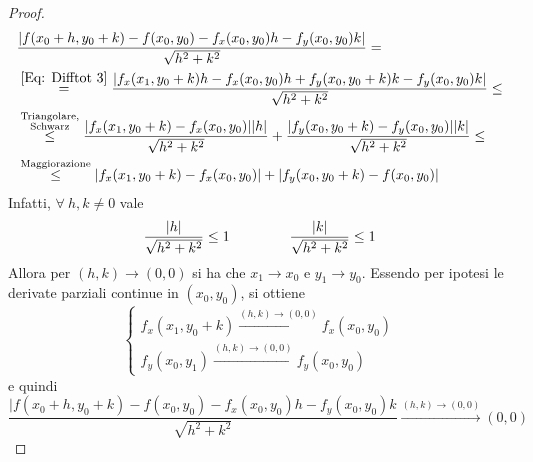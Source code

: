 \begin{theorem}
\begin{proof}
        \begin{equation}
            \begin{aligned}
                &\frac{|f(x_0+h, y_0+k)-f(x_0, y_0)-f_x(x_0, y_0)h-f_y(x_0, y_0)k|}{\sqrt{h^2+k^2}}=\\
                &\overset{\eqref{Eq: Difftot 3}}{=}\frac{|f_x(x_1, y_0+k)h-f_x(x_0, y_0)h+f_y(x_0, y_0+k)k-f_y(x_0, y_0)k|}{\sqrt{h^2+k^2}}\leq\\
                &\overset{\substack{\text{Triangolare,}\\\text{Schwarz}}}{\leq} \frac{|f_x(x_1, y_0+k)-f_x(x_0, y_0)||h|}{\sqrt{h^2+k^2}}+\frac{|f_y(x_0, y_0+k)-f_y(x_0, y_0)||k|}{\sqrt{h^2+k^2}}\leq\\
                &\overset{\text{Maggiorazione}}{\leq} |f_x(x_1, y_0+k)-f_x(x_0, y_0)|+|f_y(x_0, y_0+k)-f(x_0, y_0)|
            \end{aligned}
        \end{equation}
        Infatti, $\forall\ h,k \neq 0$ vale
        \begin{equation}
            \frac{|h|}{\sqrt{h^2+k^2}}\leq 1 \hspace{1.5 cm} \frac{|k|}{\sqrt{h^2+k^2}}\leq 1
        \end{equation}
        Allora per $(h,k) \to (0,0)$ si ha che $x_1 \to x_0$ e $y_1 \to y_0$. Essendo per ipotesi le derivate parziali continue in $(x_0, y_0)$, si ottiene
        \begin{equation}
            \begin{cases}
                f_x(x_1, y_0+k) \overset{(h, k) \to (0,0)}{\to} f_x(x_0, y_0)\\
                f_y(x_0, y_1) \overset{(h, k) \to (0,0)}{\to} f_y(x_0, y_0)
            \end{cases}
        \end{equation} 
        e quindi 
        \begin{equation}
            \frac{|f(x_0+h, y_0+k)-f(x_0, y_0)-f_x(x_0, y_0)h-f_y(x_0, y_0)k}{\sqrt{h^2+k^2}} \overset{(h,k)\to(0,0)}{\to} (0,0)
        \end{equation}
    \end{proof}
\end{theorem}
